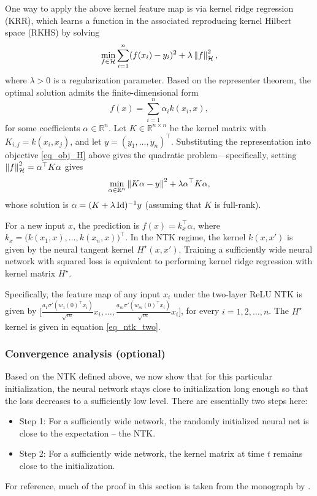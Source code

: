 \begin{example}
One way to apply the above kernel feature map is via kernel ridge regression (KRR), which learns a function in the associated reproducing kernel Hilbert space (RKHS) by solving
\begin{align}
    \min_{f \in \mathcal{H}} \sum_{i=1}^n (f(x_i)-y_i)^2 + \lambda \left\| f \right\|_{\mathcal{H}}^2, \label{eq_obj_H}
\end{align}
where $\lambda>0$ is a regularization parameter.
Based on the representer theorem, the optimal solution admits the finite-dimensional form
\[ f(x) = \sum_{i=1}^n \alpha_i k(x_i,x), \]
for some coefficients $\alpha \in \mathbb{R}^n$.
Let $K \in \mathbb{R}^{n \times n}$ be the kernel matrix with $K_{i, j} = k(x_i,x_j)$, and let $y = (y_1,\dots,y_n)^\top$.
Substituting the representation into objective \eqref{eq_obj_H} above gives the quadratic problem---specifically, setting $\left\| f \right\|_{\mathcal{H}}^2 = \alpha^{\top} K \alpha$ gives
\[ \min_{\alpha\in\mathbb{R}^n} \left\| K\alpha - y \right\|^2 + \lambda \alpha^\top K \alpha, \]
whose solution is $\alpha = (K + \lambda \operatorname{Id})^{-1} y$ (assuming that $K$ is full-rank).

For a new input $x$, the prediction is $f(x) = k_x^\top \alpha$, where $k_x = \big(k(x_1, x),\dots,k(x_n, x)\big)^\top$.
In the NTK regime, the kernel $k(x,x')$ is given by the neural tangent kernel $H^\star(x, x')$. Training a sufficiently wide neural network with squared loss is equivalent to performing kernel ridge regression with kernel matrix $H^\star$.

Specifically, the feature map of any input $x_i$ under the two-layer ReLU NTK is given by $\big[\frac{a_1 \sigma'(w_1(0)^{\top} x_i)}{\sqrt m} x_i, \dots, \frac{a_m \sigma'(w_m(0)^{\top} x_i)}{\sqrt m} x_i\big]$, for every $i = 1, 2, \dots, n$.
The $H^{\star}$ kernel is given in equation \eqref{eq_ntk_two}.
\end{example}

\subsubsection{Convergence analysis (optional)}

Based on the NTK defined above, we now show that for this particular initialization, the neural network stays close to initialization long enough so that the loss decreases to a sufficiently low level.
There are essentially two steps here:
\begin{itemize}
    \item Step 1: For a sufficiently wide network, the randomly initialized neural net is close to the expectation -- the NTK.
    
    \item Step 2: For a sufficiently wide network, the kernel matrix at time $t$ remains close to the initialization.
\end{itemize}
For reference, much of the proof in this section is taken from the monograph by \cite{arora2020theory}.

